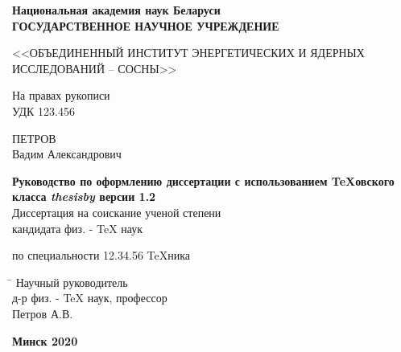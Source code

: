 \begin{titlepage}

\begin{center} \bfseries
 Национальная академия наук Беларуси\\
\bigskip
{ГОСУДАРСТВЕННОЕ НАУЧНОЕ УЧРЕЖДЕНИЕ}
\medskip

{<<ОБЪЕДИНЕННЫЙ ИНСТИТУТ ЭНЕРГЕТИЧЕСКИХ
И ЯДЕРНЫХ ИССЛЕДОВАНИЙ – СОСНЫ>>}
\end{center}
\medskip

\noindent На правах рукописи\\
УДК  123.456 \\
\vspace{1cm}

\begin{center}
{\large ПЕТРОВ \\ Вадим Александрович}\\ \vspace{1cm}

{\bfseries Руководство по оформлению диссертации с использованием \TeX овского класса {\itshape thesisby} версии 1.2}\\
\vspace{2cm}
Диссертация на соискание ученой степени\\
кандидата физ. - \TeX{} наук\\
\medskip

по специальности 12.34.56 \TeX ника 
\end{center}
\vspace{3cm}

\begin{tabbing}
\hspace{8cm} \= \kill \>
Научный руководитель \+ \\
д-р физ. - \TeX{} наук, профессор\\
Петров А.В.
\end{tabbing}
\vspace{5cm}

\begin{center}
 \bfseries Минск 2020
\end{center}

\end{titlepage}